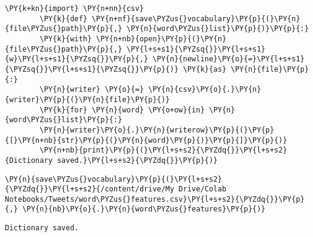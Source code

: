 \begin{tcolorbox}[breakable, size=fbox, boxrule=1pt, pad at break*=1mm,colback=cellbackground, colframe=cellborder]
    \begin{Verbatim}[commandchars=\\\{\}]
        \PY{k+kn}{import} \PY{n+nn}{csv}
        \PY{k}{def} \PY{n+nf}{save\PYZus{}vocabulary}\PY{p}{(}\PY{n}{file\PYZus{}path}\PY{p}{,} \PY{n}{word\PYZus{}list}\PY{p}{)}\PY{p}{:}
        \PY{k}{with} \PY{n+nb}{open}\PY{p}{(}\PY{n}{file\PYZus{}path}\PY{p}{,} \PY{l+s+s1}{\PYZsq{}}\PY{l+s+s1}{w}\PY{l+s+s1}{\PYZsq{}}\PY{p}{,} \PY{n}{newline}\PY{o}{=}\PY{l+s+s1}{\PYZsq{}}\PY{l+s+s1}{\PYZsq{}}\PY{p}{)} \PY{k}{as} \PY{n}{file}\PY{p}{:}
        \PY{n}{writer} \PY{o}{=} \PY{n}{csv}\PY{o}{.}\PY{n}{writer}\PY{p}{(}\PY{n}{file}\PY{p}{)}
        \PY{k}{for} \PY{n}{word} \PY{o+ow}{in} \PY{n}{word\PYZus{}list}\PY{p}{:}
        \PY{n}{writer}\PY{o}{.}\PY{n}{writerow}\PY{p}{(}\PY{p}{[}\PY{n+nb}{str}\PY{p}{(}\PY{n}{word}\PY{p}{)}\PY{p}{]}\PY{p}{)}
        \PY{n+nb}{print}\PY{p}{(}\PY{l+s+s2}{\PYZdq{}}\PY{l+s+s2}{Dictionary saved.}\PY{l+s+s2}{\PYZdq{}}\PY{p}{)}
    \end{Verbatim}
\end{tcolorbox}

\begin{tcolorbox}[breakable, size=fbox, boxrule=1pt, pad at break*=1mm,colback=cellbackground, colframe=cellborder]
    \begin{Verbatim}[commandchars=\\\{\}]
        \PY{n}{save\PYZus{}vocabulary}\PY{p}{(}\PY{l+s+s2}{\PYZdq{}}\PY{l+s+s2}{/content/drive/My Drive/Colab Notebooks/Tweets/word\PYZus{}features.csv}\PY{l+s+s2}{\PYZdq{}}\PY{p}{,} \PY{n}{nb}\PY{o}{.}\PY{n}{word\PYZus{}features}\PY{p}{)}
    \end{Verbatim}
\end{tcolorbox}

\begin{Verbatim}[commandchars=\\\{\}]
    Dictionary saved.
\end{Verbatim}
